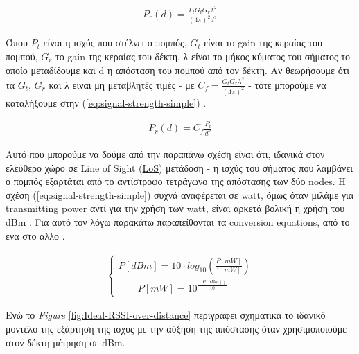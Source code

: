 \begin{align}
	P_r(d)=\frac{P_tG_tG_r\lambda^2}{(4\pi)^2d^2} \label{eq:signal-strength}
\end{align}

Όπου $P_t$ είναι η ισχύς που στέλνει ο πομπός, $G_t$ είναι το gain της κεραίας του
πομπού, $G_r$ το gain της κεραίας του δέκτη, λ είναι το μήκος κύματος του σήματος
το οποίο μεταδίδουμε και d η απόσταση του πομπού από τον δέκτη. Αν θεωρήσουμε ότι 
τα $G_t$, $G_r$ και λ είναι μη μεταβλητές τιμές - με $C_f = \frac{G_tG_r\lambda^2}{(4\pi)^2}$ - τότε μπορούμε να καταλήξουμε
στην (\ref{eq:signal-strength-simple}) \cite{rssi-simple-formula}.

\begin{align}
	P_r(d)=C_f\frac{P_t}{d^2} \label{eq:signal-strength-simple}
\end{align}

Αυτό που μπορούμε να δούμε από την παραπάνω σχέση είναι ότι, ιδανικά στον ελεύθερο 
χώρο σε Line of Sight (\hyperref[abbr:LoS]{LoS}) μετάδοση -
η ισχύς του σήματος που λαμβάνει ο πομπός εξαρτάται από το αντίστροφο τετράγωνο της
απόστασης των δύο nodes. Η σχέση (\ref{eq:signal-strength-simple}) συχνά αναφέρεται σε watt, 
όμως όταν μιλάμε για transmitting power αντί για την χρήση των watt, είναι αρκετά βολική
η χρήση του dBm \cite{wikipedia-dBm}. Για αυτό τον λόγω παρακάτω παραπείθονται τα conversion
equations, από το ένα στο άλλο \cite{rssi-wlan} \cite{wikipedia-dBm}. 

\begin{align}
	\left\{
		\begin{array}{ll}
			P[dBm]= 10\cdot log_{10}\left(\frac{P[mW]}{1[mW]}\right) \\[10pt]
			\quad \quad P[mW] = 10^\frac{(P[dBm])}{10}
		\end{array}
	\right.
\end{align}

Ενώ το \emph{Figure} \ref{fig:Ideal-RSSI-over-distance} περιγράφει σχηματικά το ιδανικό μοντέλο της εξάρτηση της ισχύς με την αύξηση
της απόστασης όταν χρησιμοποιούμε στον δέκτη μέτρηση σε dΒm. 


